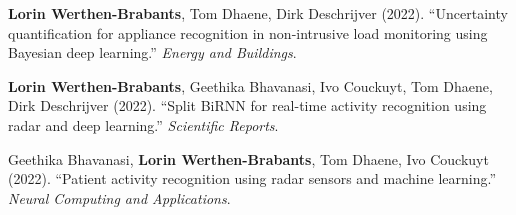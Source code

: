 \documentclass[10.5pt,a4paper]{article}
\begin{document}
\begin{enumerate}[leftmargin=1.4em, itemsep=4pt, topsep=2pt, label={[\arabic*]}]
\item \textbf{Lorin Werthen-Brabants}, Tom Dhaene, Dirk Deschrijver (2022). ``Uncertainty quantification for appliance recognition in non-intrusive load monitoring using Bayesian deep learning.'' \textit{Energy and Buildings}.
\item \textbf{Lorin Werthen-Brabants}, Geethika Bhavanasi, Ivo Couckuyt, Tom Dhaene, Dirk Deschrijver (2022). ``Split BiRNN for real-time activity recognition using radar and deep learning.'' \textit{Scientific Reports}.
\item Geethika Bhavanasi, \textbf{Lorin Werthen-Brabants}, Tom Dhaene, Ivo Couckuyt (2022). ``Patient activity recognition using radar sensors and machine learning.'' \textit{Neural Computing and Applications}.
\end{enumerate}
\end{document}
